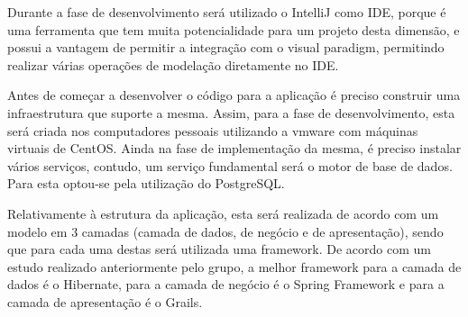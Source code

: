 Durante a fase de desenvolvimento será utilizado o IntelliJ como IDE, porque é uma ferramenta que tem muita potencialidade para um projeto desta dimensão, e possui a vantagem de permitir a integração com o visual paradigm, permitindo realizar várias operações de modelação diretamente no IDE.

Antes de começar a desenvolver o código para a aplicação é preciso construir uma infraestrutura que suporte a mesma. Assim, para a fase de desenvolvimento, esta será criada nos computadores pessoais utilizando a vmware com máquinas virtuais de CentOS. Ainda na fase de implementação da mesma, é preciso instalar vários serviços, contudo, um serviço fundamental será o motor de base de dados. Para esta optou-se pela utilização do PostgreSQL.

Relativamente à estrutura da aplicação, esta será realizada de acordo com um modelo em 3 camadas (camada de dados, de negócio e de apresentação), sendo que para cada uma destas será utilizada uma framework. De acordo com um estudo realizado anteriormente pelo grupo, a melhor framework para a camada de dados é o Hibernate, para a camada de negócio é o Spring Framework e para a camada de apresentação é o Grails.
